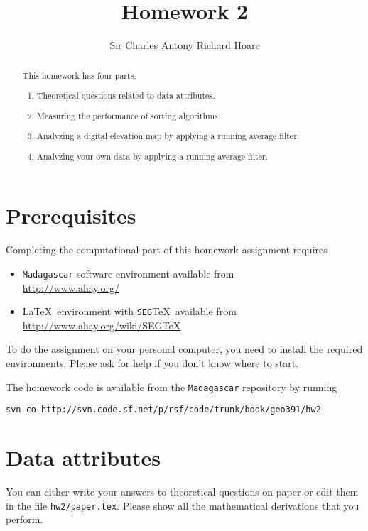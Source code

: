 \author{Sir Charles Antony Richard Hoare}
\title{Homework 2}

\begin{abstract}
  This homework has four parts. 
  \begin{enumerate}
  \item Theoretical questions related to data attributes.
  \item Measuring the performance of sorting algorithms.
  \item Analyzing a digital elevation map by applying a running average filter.
  \item Analyzing your own data by applying a running average filter.
  \end{enumerate}
\end{abstract}

\section{Prerequisites}

Completing the computational part of this homework assignment requires
\begin{itemize}
\item \texttt{Madagascar} software environment available from \\
\url{http://www.ahay.org/}
\item \LaTeX\ environment with \texttt{SEG}\TeX\ available from \\ 
\url{http://www.ahay.org/wiki/SEGTeX}
\end{itemize}
To do the assignment on your personal computer, you need to install
the required environments. Please ask for help if you don't know where
to start.

The homework code is available from the \texttt{Madagascar} repository
by running
\begin{verbatim}
svn co http://svn.code.sf.net/p/rsf/code/trunk/book/geo391/hw2
\end{verbatim}

\section{Data attributes}

You can either write your answers to theoretical questions on paper or
edit them in the file \texttt{hw2/paper.tex}. Please show all the
mathematical derivations that you perform.


